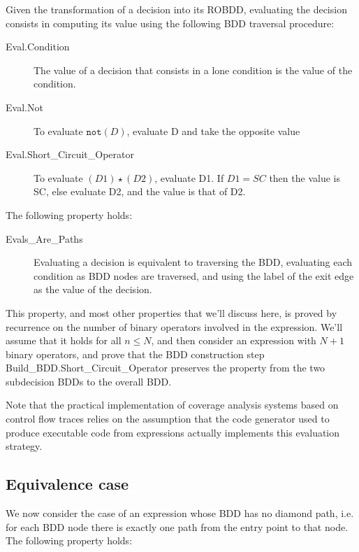 \documentclass[a4paper,12pt,twoside]{article}
\renewcommand{\le}{\leqslant}
\newcommand{\anysc}{\star}
\newcommand{\adanot}{\texttt{not}}
\begin{document}
Given the transformation of a decision into its ROBDD, evaluating the
decision consists in computing its value using the following BDD traversal
procedure:

\begin{description}
\item[Eval.Condition]
  The value of a decision that consists in a lone condition is the
  value of the condition.

\item[Eval.Not]
  To evaluate $\adanot{} (D)$, evaluate D and take the opposite value

\item[Eval.Short\_Circuit\_Operator]
  To evaluate $(D1) \anysc{} (D2)$, evaluate D1. If $D1 = SC$ then the
  value is SC, else evaluate D2, and the value is that of D2.
\end{description}

The following property holds:

\begin{description}
\item[Evals\_Are\_Paths]
  Evaluating a decision is equivalent to traversing the BDD, evaluating
  each condition as BDD nodes are traversed, and using the label of the
  exit edge as the value of the decision.
\end{description}

This property, and most other properties that we'll discuss here,
is proved by recurrence on the number of binary operators involved in
the expression. We'll assume that it holds for all $n \le{} N$, and then
consider an expression with $N+1$ binary operators, and prove that
the BDD construction step Build\_BDD.Short\_Circuit\_Operator preserves
the property from the two subdecision BDDs to the overall BDD.

Note that the practical implementation of coverage analysis systems based
on control flow traces relies on the assumption that the code generator
used to produce executable code from expressions actually implements this
evaluation strategy.

\subsection{Equivalence case}

We now consider the case of an expression whose BDD has no diamond path,
i.e. for each BDD node there is exactly one path from the entry point to
that node. The following property holds:
\end{document}
